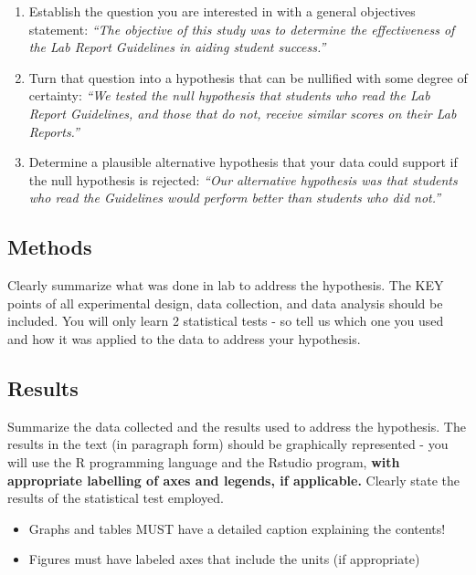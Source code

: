 \documentclass[11pt,]{article}
\providecommand{\tightlist}{%
  \setlength{\itemsep}{0pt}\setlength{\parskip}{0pt}}
\begin{document}
\begin{enumerate}
\def\labelenumi{\arabic{enumi}.}
\item
  Establish the question you are interested in with a general objectives
  statement: \emph{``The objective of this study was to determine the
  effectiveness of the Lab Report Guidelines in aiding student
  success.''}
\item
  Turn that question into a hypothesis that can be nullified with some
  degree of certainty: \emph{``We tested the null hypothesis that
  students who read the Lab Report Guidelines, and those that do not,
  receive similar scores on their Lab Reports.''}
\item
  Determine a plausible alternative hypothesis that your data could
  support if the null hypothesis is rejected: \emph{``Our alternative
  hypothesis was that students who read the Guidelines would perform
  better than students who did not.''}
\end{enumerate}

\subsection{Methods}\label{methods}

Clearly summarize what was done in lab to address the hypothesis. The
KEY points of all experimental design, data collection, and data
analysis should be included. You will only learn 2 statistical tests -
so tell us which one you used and how it was applied to the data to
address your hypothesis.

\subsection{Results}\label{results}

Summarize the data collected and the results used to address the
hypothesis. The results in the text (in paragraph form) should be
graphically represented - you will use the R programming language and
the Rstudio program, \textbf{with appropriate labelling of axes and
legends, if applicable.} Clearly state the results of the statistical
test employed.

\begin{itemize}
\tightlist
\item
  Graphs and tables MUST have a detailed caption explaining the
  contents!
\item
  Figures must have labeled axes that include the units (if appropriate)
\end{itemize}
\end{document}
